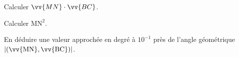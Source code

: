 \documentclass[11pt,a4paper]{article}  %
\begin{document}
\begin{enumMet}
	\item Calculer $\vv{MN} \cdot \vv{BC}$.
	\item Calculer $\mathrm{MN}^2$.
%		
	\item En déduire une valeur approchée en degré à $10^{-1}$ près de l'angle géométrique $|(\vv{\mathrm{MN}}, \vv{\mathrm{BC}})|$.
\end{enumMet}
\end{document}

